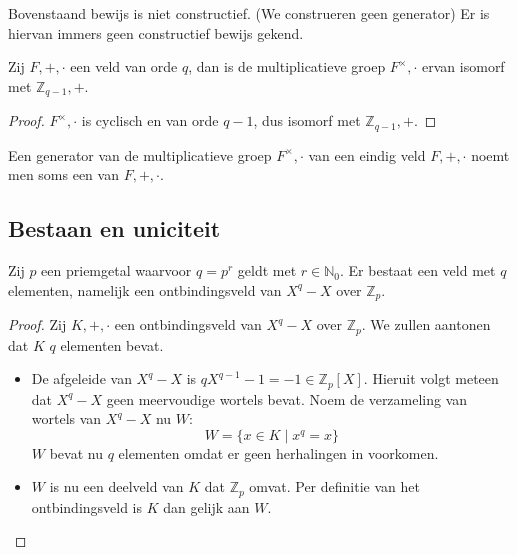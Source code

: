 \documentclass[main.tex]{subfiles}
\begin{document}
\begin{opm}
  Bovenstaand bewijs is niet constructief.
  (We construeren geen generator)
  Er is hiervan immers geen constructief bewijs gekend.
\end{opm}

\begin{gev}
  Zij $F,+,\cdot$ een veld van orde $q$, dan is de multiplicatieve groep $F^{\times},\cdot$ ervan isomorf met $\mathbb{Z}_{q-1},+$.

  \begin{proof}
    $F^{\times},\cdot$ is cyclisch en van orde $q-1$, dus isomorf met $\mathbb{Z}_{q-1},+$. \needed
  \end{proof}
\end{gev}

\begin{de}
  Een generator van de multiplicatieve groep $F^{\times},\cdot$ van een eindig veld $F,+,\cdot$ noemt men soms een  van $F,+,\cdot$.
\end{de}

\subsection{Bestaan en uniciteit}
\label{sec:bestaan-en-uniciteit}

\begin{st}
  \label{st:priemveld-bestaat}
  Zij $p$ een priemgetal waarvoor $q=p^{r}$ geldt met $r\in \mathbb{N}_{0}$.
  Er bestaat een veld met $q$ elementen, namelijk een ontbindingsveld van $X^{q}-X$ over $\mathbb{Z}_{p}$.

  \begin{proof}
    Zij $K,+,\cdot$ een ontbindingsveld van $X^{q}-X$ over $\mathbb{Z}_{p}$.
    We zullen aantonen dat $K$ $q$ elementen bevat.
    \begin{itemize}
    \item De afgeleide van $X^{q}-X$ is $qX^{q-1}-1 = -1\in \mathbb{Z}_{p}[X]$.
      Hieruit volgt meteen dat $X^{q}-X$ geen meervoudige wortels bevat.
      Noem de verzameling van wortels van $X^{q}-X$ nu $W$:
      \[ W = \{ x\in K \mid x^{q} = x\} \]
      $W$ bevat nu $q$ elementen omdat er geen herhalingen in voorkomen.
    \item $W$ is nu een deelveld van $K$ dat $\mathbb{Z}_{p}$ omvat. \waarom
      Per definitie van het ontbindingsveld is $K$ dan gelijk aan $W$.
    \end{itemize}
  \end{proof}
\end{st}
\end{document}
